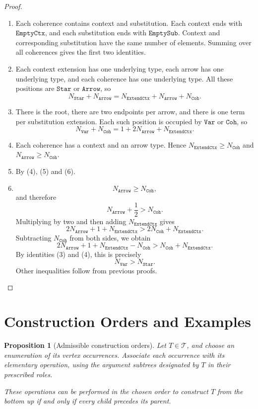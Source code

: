 \documentclass{article}%
\newtheorem{proposition}[theorem]{Proposition}
\theoremstyle{remark}
\theoremstyle{definition}
\theoremstyle{definition}
\theoremstyle{plain}
\begin{document}
\begin{proof}
\begin{enumerate}
\item[1. 2.] Each coherence contains context and substitution. Each context ends
with \(\mathtt{EmptyCtx}\), and each substitution ends with
\(\mathtt{EmptySub}\). Context and corresponding substitution have the same
number of elements. Summing over all coherences gives the first two identities.

\item[3.] Each context extension has one underlying type, each arrow has one
underlying type, and each coherence has one underlying type. All these positions
are \(\mathtt{Star}\) or \(\mathtt{Arrow}\), so
\[
  N_{\mathtt{Star}}+N_{\mathtt{Arrow}}=N_{\mathtt{ExtendCtx}}+N_{\mathtt{Arrow}}+N_{\mathtt{Coh}}.
\]

\item[4.] There is the root, there are two endpoints per arrow, and there is
one term per substitution extension. Each such position is occupied by
\(\mathtt{Var}\) or \(\mathtt{Coh}\), so
\[
  N_{\mathtt{Var}}+N_{\mathtt{Coh}}=1+2N_{\mathtt{Arrow}}+N_{\mathtt{ExtendCtx}}.
\]
\item[5. 6.] Each coherence has a context and an arrow type. Hence
\(N_{\mathtt{ExtendCtx}}\ge N_{\mathtt{Coh}}\) and \(N_{\mathtt{Arrow}}\ge
N_{\mathtt{Coh}}\).
\item[7.] By (4), (5) and (6). 
\item[8.]
\[
  N_{\mathtt{Arrow}} \geq N_{\mathtt{Coh}},
\]
and therefore
\[
  N_{\mathtt{Arrow}}+\frac12>N_{\mathtt{Coh}}.
\]
Multiplying by two and then adding
\(N_{\mathtt{ExtendCtx}}\) gives
\[
  2N_{\mathtt{Arrow}}+1+N_{\mathtt{ExtendCtx}}
  >
  2N_{\mathtt{Coh}}+N_{\mathtt{ExtendCtx}}.
\]
Subtracting \(N_{\mathtt{Coh}}\) from both sides, we obtain
\[
  2N_{\mathtt{Arrow}}+1+N_{\mathtt{ExtendCtx}}
  -N_{\mathtt{Coh}}
  >
  N_{\mathtt{Coh}}+N_{\mathtt{ExtendCtx}}.
\]
By identities (3) and (4), this is precisely
\[
  N_{\mathtt{Var}}>N_{\mathtt{Star}}.
\]
Other inequalities follow from previous proofs.
\end{enumerate}
\end{proof}

\section{Construction Orders and Examples}
\begin{proposition}[Admissible construction orders]
\label{prop:construction-orders}
Let \(T\in\mathcal{T}\), and choose an enumeration of its vertex occurrences.
Associate each occurrence with its elementary operation, using the argument
subtrees designated by \(T\) in their prescribed roles.

These operations can be performed in the chosen order to construct \(T\) from
the bottom up if and only if every child precedes its parent.
\end{proposition}
\end{document}

